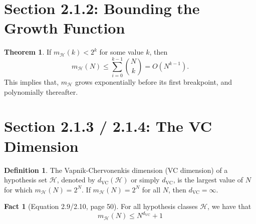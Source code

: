 \documentclass[10pt]{exam}
\theoremstyle{definition}
\newtheorem{defn}{Definition}
\newtheorem{fact}{Fact}
\newtheorem{theorem}{Theorem}
\newcommand{\mH}{m_{\mathcal H}}
\newcommand{\dvc}{{d_{\text{VC}}}}
\begin{document}

\section*{Section 2.1.2: Bounding the Growth Function}

\begin{theorem}
    If $\mH(k) < 2^k$ for some value $k$, then
    \begin{equation}
        \mH(N)
        \le \sum_{i=0}^{k-1} {N \choose k}
        =
        O(N^{k-1})
        .
    \end{equation}
    This implies that, $\mH$ grows exponentially before its first breakpoint,
    and polynomially thereafter.
\end{theorem}

\newpage
\section*{Section 2.1.3 / 2.1.4: The VC Dimension}

\begin{defn}
    The Vapnik-Chervonenkis dimension (VC dimension) of a hypothesis set $\mathcal H$, denoted by $\dvc(\mathcal H)$ or simply $\dvc$, is the largest value of $N$ for which $\mH(N) = 2^N$.
    If $\mH(N) = 2^N$ for all $N$, then $\dvc = \infty$.
\end{defn}

%

\begin{fact}[Equation 2.9/2.10, page 50]
    \label{fact:2.10}
    For all hypothesis classes $\mathcal H$, we have that
    \begin{equation}
        \label{eq:mHdvc}
        \mH(N) \le N^\dvc + 1
    \end{equation}
\end{fact}
\end{document}
